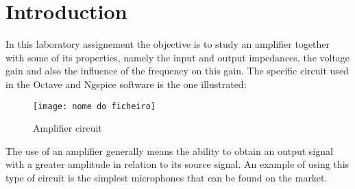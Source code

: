 \section{Introduction}
\label{sec:intro}


\par In this laboratory assignement the objective is to study an amplifier together with some of its properties, namely the input and output impedances, the voltage gain and also the influence of the frequency on this gain. The specific circuit used in the Octave and Ngspice software is the one illustrated:


\begin{figure} [!htb] 
  \texttt{[image: nome do ficheiro]}
  \caption{Amplifier circuit}
  \label{fig:theoplots}
  \endminipage\hfill
\end{figure}


\par The use of an amplifier generally means the ability to obtain an output signal with a greater amplitude in relation to its source signal. An example of using this type of circuit is the simplest microphones that can be found on the market.


